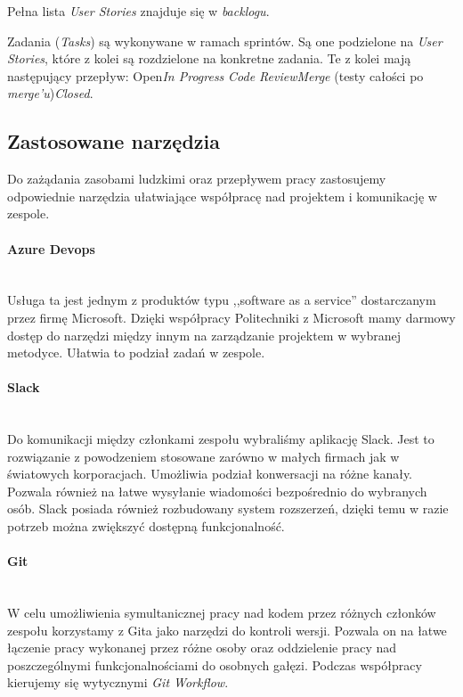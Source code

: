 \documentclass[10pt, titlepage, oneside, a4paper]{article}
\begin{document}
	Pełna lista \textit{User Stories} znajduje się w \textit{backlogu}.

	Zadania (\textit{Tasks}) są wykonywane w ramach sprintów. Są one podzielone na \textit{User Stories}, które z kolei są rozdzielone na konkretne zadania. Te z kolei mają następujący przepływ: Open\textrightarrow \textit{In Progress} \textrightarrow \textit{Code Review}\textrightarrow \textit{Merge} (testy całości po \textit{merge'u})\textrightarrow \textit{Closed}.
	
	\subsection{Zastosowane narzędzia}
	Do zażądania zasobami ludzkimi oraz przepływem pracy zastosujemy odpowiednie narzędzia ułatwiające współpracę nad projektem i komunikację w zespole.

	\paragraph{Azure Devops} \mbox{} \\
	Usługa ta jest jednym z produktów typu ,,software as a service'' dostarczanym przez firmę Microsoft.
	Dzięki współpracy Politechniki z Microsoft mamy darmowy dostęp do narzędzi między innym na zarządzanie projektem w wybranej metodyce. Ułatwia to podział zadań w zespole.

	\paragraph{Slack} \mbox{} \\
	Do komunikacji między członkami zespołu wybraliśmy aplikację Slack. Jest to rozwiązanie z powodzeniem stosowane zarówno w małych firmach jak w światowych korporacjach.
	Umożliwia podział konwersacji na różne kanały. Pozwala również na łatwe wysyłanie wiadomości bezpośrednio do wybranych osób.
	Slack posiada również rozbudowany system rozszerzeń, dzięki temu w razie potrzeb można zwiększyć dostępną funkcjonalność.

	\paragraph{Git} \mbox{} \\
	W celu umożliwienia symultanicznej pracy nad kodem przez różnych członków zespołu korzystamy z Gita jako narzędzi do kontroli wersji.
	Pozwala on na łatwe łączenie pracy wykonanej przez różne osoby oraz oddzielenie pracy nad poszczególnymi funkcjonalnościami do osobnych gałęzi.
	Podczas współpracy kierujemy się wytycznymi \textit{Git Workflow}.
 
\end{document}
